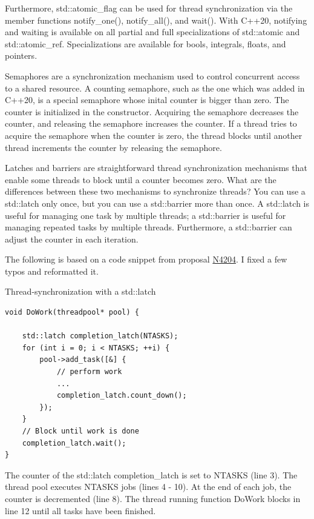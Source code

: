 Furthermore, std::atomic\_flag can be used for thread synchronization via the member functions notify\_one(), notify\_all(), and wait(). With C++20, notifying and waiting is available on all partial and full specializations of std::atomic and std::atomic\_ref. Specializations are available for bools, integrals, floats, and pointers.


Semaphores are a synchronization mechanism used to control concurrent access to a shared resource. A counting semaphore, such as the one which was added in C++20, is a special semaphore whose inital counter is bigger than zero. The counter is initialized in the constructor. Acquiring the semaphore decreases the counter, and releasing the semaphore increases the counter. If a thread tries to acquire the semaphore when the counter is zero, the thread blocks until another thread increments the counter by releasing the semaphore.



Latches and barriers are straightforward thread synchronization mechanisms that enable some threads to block until a counter becomes zero. What are the differences between these two mechanisms to synchronize threads? You can use a std::latch only once, but you can use a std::barrier more than once. A std::latch is useful for managing one task by multiple threads; a std::barrier is useful for managing repeated tasks by multiple threads. Furthermore, a std::barrier can adjust the counter in each iteration.

The following is based on a code snippet from proposal \href{http://www.open-std.org/jtc1/sc22/wg21/docs/papers/2014/n4204.html}{N4204}. I fixed a few typos and reformatted it.

\noindent
Thread-synchronization with a std::latch
\begin{lstlisting}[style=styleCXX]
void DoWork(threadpool* pool) {

	std::latch completion_latch(NTASKS);
	for (int i = 0; i < NTASKS; ++i) {
		pool->add_task([&] {
			// perform work
			...
			completion_latch.count_down();
		});
	}
	// Block until work is done
	completion_latch.wait();
}
\end{lstlisting}

The counter of the std::latch completion\_latch is set to NTASKS (line 3). The thread pool executes NTASKS jobs (lines 4 - 10). At the end of each job, the counter is decremented (line 8). The thread running function DoWork blocks in line 12 until all tasks have been finished.

